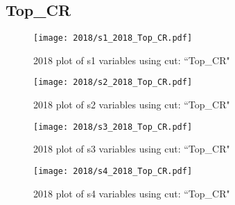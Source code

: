 \documentclass{article}
\begin{document}
      \subsection*{Top\_CR}
                        \begin{figure}[H]
                            \centering
                            \caption{2018 plot of s1 variables using cut: ``Top\_CR"}
                            \texttt{[image: 2018/s1\_2018\_Top\_CR.pdf]}
                        \end{figure}    
                        \begin{figure}[H]
                            \centering
                            \caption{2018 plot of s2 variables using cut: ``Top\_CR"}
                            \texttt{[image: 2018/s2\_2018\_Top\_CR.pdf]}
                        \end{figure}    
                        \begin{figure}[H]
                            \centering
                            \caption{2018 plot of s3 variables using cut: ``Top\_CR"}
                            \texttt{[image: 2018/s3\_2018\_Top\_CR.pdf]}
                        \end{figure}    
                        \begin{figure}[H]
                            \centering
                            \caption{2018 plot of s4 variables using cut: ``Top\_CR"}
                            \texttt{[image: 2018/s4\_2018\_Top\_CR.pdf]}
                        \end{figure}    
\end{document}
